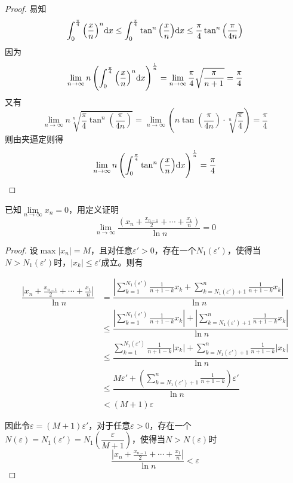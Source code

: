 \begin{proof}

    易知
    $$\int_{0}^{\frac{\pi}{4}}{\left(\dfrac{x}{n}\right)^n}\mathrm{d} x \leq \int_{0}^{\frac{\pi}{4}}{\tan^n{\left(\dfrac{x}{n}\right)}}\mathrm{d} x \leq \dfrac{\pi}{4} \tan^n{\left(\dfrac{\pi}{4n}\right)}$$
    因为
    $$\lim\limits_{n\to\infty}{n \left( \int_{0}^{\frac{\pi}{4}}{\left(\dfrac{x}{n}\right)^n}\mathrm{d} x \right)^{\frac{1}{n}}} = \lim\limits_{n\to\infty}{\dfrac{\pi}{4}\sqrt{\dfrac{\pi}{n + 1}}} = \dfrac{\pi}{4}$$
    又有
    $$\lim\limits_{n\to\infty}{n \sqrt[n]{\dfrac{\pi}{4}\tan^n{\left( \dfrac{\pi}{4n} \right)}}} = \lim\limits_{n\to\infty}{\left(n \tan{\left(\dfrac{\pi}{4n}\right)} \cdot \sqrt[n]{\dfrac{\pi}{4}}\right)} = \dfrac{\pi}{4}$$
    则由夹逼定则得
    $$\lim\limits_{n\to\infty}{n\left(\int_{0}^{\frac{\pi}{4}}{\tan^n{\left(\dfrac{x}{n}\right)}}\mathrm{d} x\right)^{\frac{1}{n}}} = \dfrac{\pi}{4}$$

\end{proof}

\begin{proposition}

    已知$\lim\limits_{n\to\infty}{x_n} = 0$，用定义证明
    $$\lim\limits_{n\to\infty}{\dfrac{\left(x_n + \frac{x_{n - 1}}{2} + \cdots + \frac{x_1}{n}\right)}{\ln n}} = 0$$

\end{proposition}

\begin{proof}

    设$\max|x_n| = M$，且对任意$\varepsilon ' > 0$，存在一个$N_1(\varepsilon ')$，使得当$N > N_1(\varepsilon ')$时，$|x_k| \leq \varepsilon '$成立。则有
    
    \begin{align*}
        \dfrac{\left|x_n + \frac{x_{n - 1}}{2} + \cdots + \frac{x_1}{n}\right|}{\ln n} & = \dfrac{\left| \sum\limits_{k = 1}^{N_1(\varepsilon ')}{\frac{1}{n + 1 - k}x_k} + \sum\limits_{k = N_1(\varepsilon ') + 1}^{n}{\frac{1}{n + 1 - k}x_k}\right|}{\ln n} \\
        & \leq \dfrac{\left| \sum\limits_{k = 1}^{N_1(\varepsilon ')}{\frac{1}{n + 1 - k}x_k} \right| + \left| \sum\limits_{k = N_1(\varepsilon ') + 1}^{n}{\frac{1}{n + 1 - k}x_k}\right|}{\ln n} \\
        & \leq \dfrac{ \sum\limits_{k = 1}^{N_1(\varepsilon ')}{\frac{1}{n + 1 - k}\left| x_k \right|} + \sum\limits_{k = N_1(\varepsilon ') + 1}^{n}{\frac{1}{n + 1 - k} \left| x_k \right|}}{\ln n} \\
        & \leq \dfrac{M \varepsilon ' + \left( \sum\limits_{k = N_1(\varepsilon ') + 1}^{n}{\frac{1}{n + 1 - k}} \right)\varepsilon '}{\ln n} \\
        & < (M + 1) \varepsilon
    \end{align*}

    因此令$\varepsilon = (M + 1)\varepsilon '$，对于任意$\varepsilon >  0$，存在一个$N(\varepsilon) = N_1(\varepsilon') = N_1(\dfrac{\varepsilon}{M + 1})$，使得当$N > N(\varepsilon)$时
    $$\dfrac{\left|x_n + \frac{x_{n - 1}}{2} + \cdots + \frac{x_1}{n}\right|}{\ln n} < \varepsilon$$

\end{proof}


